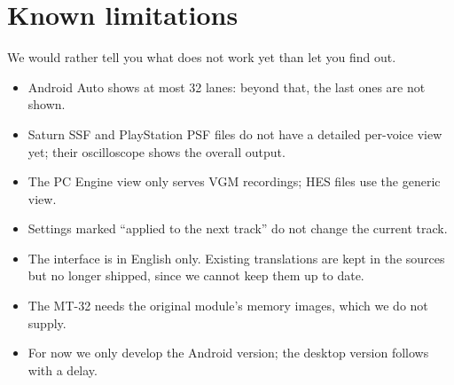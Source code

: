 \chapter{Known limitations}
We would rather tell you what does not work yet than let you find out.
\begin{itemize}
  \item Android Auto shows at most 32 lanes: beyond that, the last ones are not shown.
  \item Saturn SSF and PlayStation PSF files do not have a detailed per-voice view yet; their oscilloscope shows the
        overall output.
  \item The PC Engine view only serves VGM recordings; HES files use the generic view.
  \item Settings marked ``applied to the next track'' do not change the current track.
  \item The interface is in English only. Existing translations are kept in the sources but no longer shipped, since
        we cannot keep them up to date.
  \item The MT-32 needs the original module's memory images, which we do not supply.
  \item For now we only develop the Android version; the desktop version follows with a delay.
\end{itemize}
